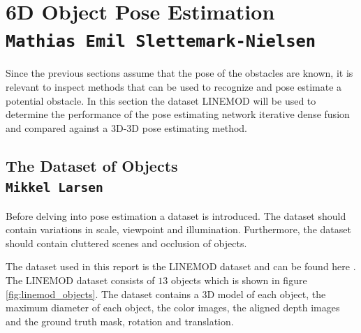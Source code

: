 \documentclass[../main.tex]{subfiles}
\begin{document}
\section{6D Object Pose Estimation \\ \normalfont\normalsize\texttt{Mathias Emil Slettemark-Nielsen}} \label{sec:pose_estimation}

Since the previous sections assume that the pose of the obstacles are known, it is relevant to inspect methods that can be used to recognize and pose estimate a potential obstacle. In this section the dataset LINEMOD \cite{linemod} will be used to determine the performance of the pose estimating network iterative dense fusion and compared against a 3D-3D pose estimating method.

\subsection{The Dataset of Objects \\ \normalfont\normalsize\texttt{Mikkel Larsen}} \label{subsec:dataset}

Before delving into pose estimation a dataset is introduced. The dataset should contain variations in scale, viewpoint and illumination. Furthermore, the dataset should contain cluttered scenes and occlusion of objects.

The dataset used in this report is the LINEMOD dataset and can be found here \cite{linemod_dataset}. The LINEMOD dataset consists of $13$ objects which is shown in figure \ref{fig:linemod_objects}. The dataset contains a 3D model of each object, the maximum diameter of each object, the color images, the aligned depth images and the ground truth mask, rotation and translation.
\end{document}
